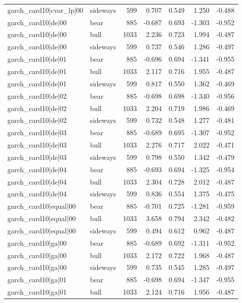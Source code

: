 \begin{table}
\begin{tabular}{llrrrrr}
garch\_card10|cvar\_lp|00 & sideways & 599 & 0.707 & 0.549 & 1.250 & -0.488 \\
garch\_card10|de|00 & bear & 885 & -0.687 & 0.693 & -1.303 & -0.952 \\
garch\_card10|de|00 & bull & 1033 & 2.236 & 0.723 & 1.994 & -0.487 \\
garch\_card10|de|00 & sideways & 599 & 0.737 & 0.546 & 1.286 & -0.497 \\
garch\_card10|de|01 & bear & 885 & -0.696 & 0.694 & -1.341 & -0.955 \\
garch\_card10|de|01 & bull & 1033 & 2.117 & 0.716 & 1.955 & -0.487 \\
garch\_card10|de|01 & sideways & 599 & 0.817 & 0.550 & 1.362 & -0.469 \\
garch\_card10|de|02 & bear & 885 & -0.698 & 0.698 & -1.340 & -0.956 \\
garch\_card10|de|02 & bull & 1033 & 2.204 & 0.719 & 1.986 & -0.469 \\
garch\_card10|de|02 & sideways & 599 & 0.732 & 0.548 & 1.277 & -0.481 \\
garch\_card10|de|03 & bear & 885 & -0.689 & 0.695 & -1.307 & -0.952 \\
garch\_card10|de|03 & bull & 1033 & 2.276 & 0.717 & 2.022 & -0.471 \\
garch\_card10|de|03 & sideways & 599 & 0.798 & 0.550 & 1.342 & -0.479 \\
garch\_card10|de|04 & bear & 885 & -0.693 & 0.694 & -1.325 & -0.954 \\
garch\_card10|de|04 & bull & 1033 & 2.304 & 0.728 & 2.012 & -0.487 \\
garch\_card10|de|04 & sideways & 599 & 0.836 & 0.554 & 1.375 & -0.475 \\
garch\_card10|equal|00 & bear & 885 & -0.701 & 0.725 & -1.281 & -0.959 \\
garch\_card10|equal|00 & bull & 1033 & 3.658 & 0.794 & 2.342 & -0.482 \\
garch\_card10|equal|00 & sideways & 599 & 0.494 & 0.612 & 0.962 & -0.487 \\
garch\_card10|ga|00 & bear & 885 & -0.689 & 0.692 & -1.311 & -0.952 \\
garch\_card10|ga|00 & bull & 1033 & 2.172 & 0.722 & 1.968 & -0.487 \\
garch\_card10|ga|00 & sideways & 599 & 0.735 & 0.545 & 1.285 & -0.497 \\
garch\_card10|ga|01 & bear & 885 & -0.698 & 0.694 & -1.347 & -0.955 \\
garch\_card10|ga|01 & bull & 1033 & 2.124 & 0.716 & 1.956 & -0.487 \\

\end{tabular}
\end{table}
